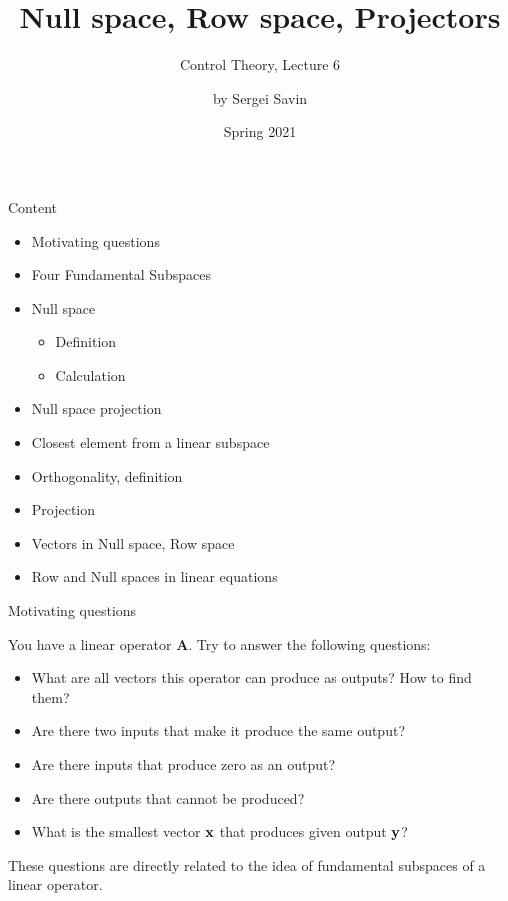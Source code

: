 \documentclass{beamer}
\title{Null space, Row space, Projectors}
\subtitle{Control Theory, Lecture 6}
\author{by Sergei Savin}
\date{Spring 2021}
\begin{document}
\maketitle


\begin{frame}{Content}

\begin{itemize}
\item Motivating questions
\item Four Fundamental Subspaces
\item Null space
\begin{itemize}
    \item Definition
    \item Calculation
\end{itemize}
\item Null space projection
\item Closest element from a linear subspace
\item Orthogonality, definition
\item Projection
\item Vectors in Null space, Row space
\item Row and Null spaces in linear equations
\end{itemize}

\end{frame}




\begin{frame}{Motivating questions}
\begin{flushleft}

You have a linear operator $\mathbf A$. Try to answer the following questions:

\begin{itemize}
    \item What are all vectors this operator can produce as outputs? How to find them?
    \item Are there two inputs that make it produce the same output?
    \item Are there inputs that produce zero as an output?
    \item Are there outputs that cannot be produced? 
    \item What is the smallest vector $\mathbf{x}$ that produces given output $\mathbf{y}$? 
\end{itemize}

These questions are directly related to the idea of fundamental subspaces of a linear operator.

\end{flushleft}
\end{frame}
\end{document}
